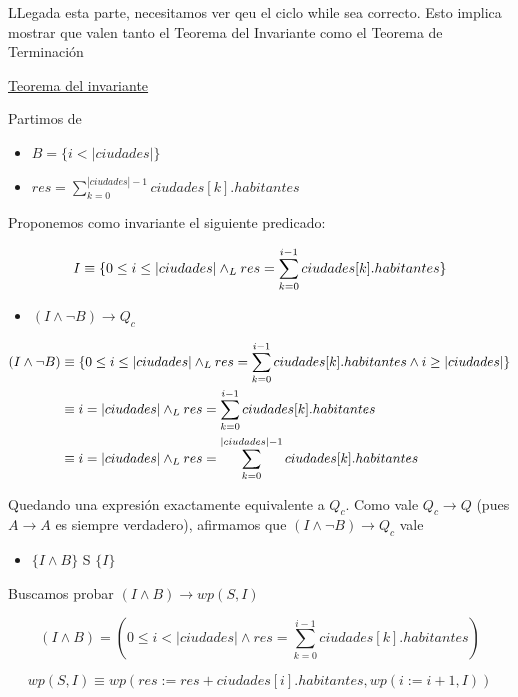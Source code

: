 \documentclass[10pt,a4paper]{article}
\begin{document}
\begin {enumerate}
    LLegada esta parte, necesitamos ver qeu el ciclo while sea correcto. Esto implica mostrar que valen tanto el Teorema del Invariante como el 
    Teorema de Terminación

    \underline{Teorema del invariante}

    Partimos de 

    \begin{itemize}
        \item $B = \{i < |ciudades| \}$
        \item $res =  \sum\limits_{k=0}^{|ciudades| - 1}{ciudades[k].habitantes}$
    \end{itemize}

    Proponemos como invariante el siguiente predicado: 

    $$I \equiv \{0 \leq i \leq |ciudades| \land _L res = \sum\limits_{k=0}^{i - 1}{ciudades[k].habitantes}\}$$

    \begin{itemize}
        \item $(I \land \neg B) \to Q_{c}$
    \end{itemize}

    \begin{align*}
        (I \land \neg B) &\equiv \{0 \leq i \leq |ciudades| \land _L res = \sum\limits_{k=0}^{i - 1}{ciudades[k].habitantes} \land i \geq |ciudades|\} \\
        &\equiv i = |ciudades| \land _L res = \sum\limits_{k=0}^{i - 1}{ciudades[k].habitantes} \\
        &\equiv i = |ciudades| \land _L res = \sum\limits_{k=0}^{|ciudades| - 1}{ciudades[k].habitantes}
    \end{align*}

    Quedando una expresión exactamente equivalente a $Q_{c}$. Como vale $Q_{c} \to Q$ (pues $A \to A$ es siempre verdadero), afirmamos que $(I \land \neg B) \to Q_{c}$ vale 


    \begin{itemize}
    \item $ \{I \land B\}$ S $\{I\}$
    \end{itemize}

    Buscamos probar $(I \land B) \to wp(S, I)$

    $$ (I \land B) = (0 \leq i < |ciudades| \land res = \sum\limits_{k=0}^{i - 1}{ciudades[k].habitantes})$$

    $$wp(S, I) \equiv wp(res := res + ciudades[i].habitantes, wp(i := i + 1, I))$$


\end{enumerate}
\end{document}
